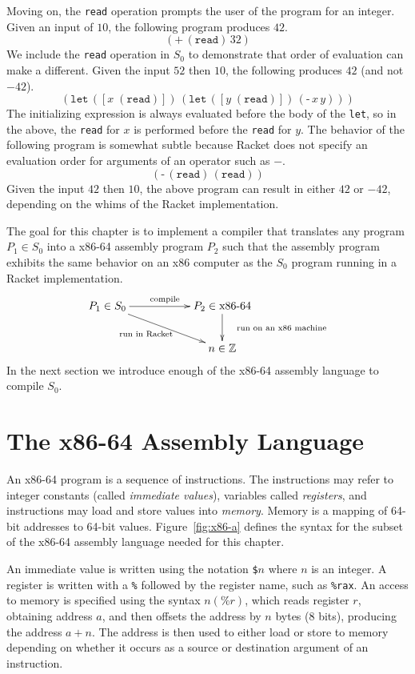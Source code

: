 \documentclass[12pt]{book}
\newcommand{\key}[1]{\texttt{#1}}
\newcommand{\READ}{(\key{read})}
\newcommand{\BINOP}[3]{(\key{#1}\,#2\,#3)}
\newcommand{\LET}[3]{(\key{let}\,([#1\;#2])\,#3)}
\begin{document}
Moving on, the \key{read} operation prompts the user of the program
for an integer. Given an input of $10$, the following program produces
$42$.
\[
\BINOP{+}{(\key{read})}{32}
\]
We include the \key{read} operation in $S_0$ to demonstrate that order
of evaluation can make a different. Given the input $52$ then $10$,
the following produces $42$ (and not $-42$).
\[
\LET{x}{\READ}{ \LET{y}{\READ}{ \BINOP{-}{x}{y} } }
\]
The initializing expression is always evaluated before the body of the
\key{let}, so in the above, the \key{read} for $x$ is performed before
the \key{read} for $y$.
%
The behavior of the following program is somewhat subtle because
Racket does not specify an evaluation order for arguments of an
operator such as $-$.
\[
\BINOP{-}{\READ}{\READ}
\]
Given the input $42$ then $10$, the above program can result in either
$42$ or $-42$, depending on the whims of the Racket implementation.

The goal for this chapter is to implement a compiler that translates
any program $P_1 \in S_0$ into a x86-64 assembly program $P_2$ such
that the assembly program exhibits the same behavior on an x86
computer as the $S_0$ program running in a Racket implementation.
\[
\xymatrix{
P_1 \in S_0  \ar[rr]^{\text{compile}} \ar[drr]_{\text{run in Racket}\quad}   &&  P_2 \in \text{x86-64} \ar[d]^{\quad\text{run on an x86 machine}}\\
& & n \in \mathbb{Z}   
}
\]
In the next section we introduce enough of the x86-64 assembly
language to compile $S_0$.

\section{The x86-64 Assembly Language}
\label{sec:x86-64}

An x86-64 program is a sequence of instructions. The instructions may
refer to integer constants (called \emph{immediate values}), variables
called \emph{registers}, and instructions may load and store values
into \emph{memory}.  Memory is a mapping of 64-bit addresses to 64-bit
values. Figure~\ref{fig:x86-a} defines the syntax for the subset of
the x86-64 assembly language needed for this chapter.

An immediate value is written using the notation \key{\$}$n$ where $n$
is an integer. 
%
A register is written with a \key{\%} followed by the register name,
such as \key{\%rax}.
%
An access to memory is specified using the syntax $n(\key{\%}r)$,
which reads register $r$, obtaining address $a$, and then offsets the
address by $n$ bytes (8 bits), producing the address $a + n$. The
address is then used to either load or store to memory depending on
whether it occurs as a source or destination argument of an
instruction.
\end{document}
